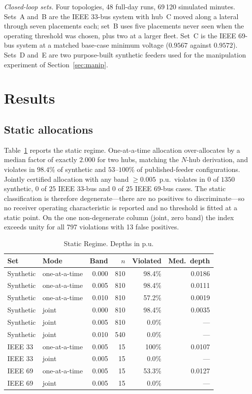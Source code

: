 \documentclass[lettersize,journal]{IEEEtran}
\begin{document}
\emph{Closed-loop sets.} Four topologies, 48 full-day runs, 69\,120 simulated
minutes. Sets~A and~B are the IEEE 33-bus system with hub~C moved along a
lateral through seven placements each; set~B uses five placements never seen
when the operating threshold was chosen, plus two at a larger fleet. Set~C is
the IEEE 69-bus system at a matched base-case minimum voltage ($0.9567$ against
$0.9572$). Sets~D and~E are two purpose-built synthetic feeders used for the
manipulation experiment of Section~\ref{sec:manip}.

\section{Results}\label{sec:results}

\subsection{Static allocations}
Table~\ref{tab:static} reports the static regime. One-at-a-time allocation
over-allocates by a median factor of exactly $2.000$ for two hubs, matching the
$N$-hub derivation, and violates in $98.4\%$ of synthetic and $53$--$100\%$ of
published-feeder configurations. Jointly certified allocation with any band
$\ge 0.005$~p.u.\ violates in $0$ of $1350$ synthetic, $0$ of $25$ IEEE 33-bus
and $0$ of $25$ IEEE 69-bus cases. The static classification is therefore
degenerate---there are no positives to discriminate---so no receiver operating
characteristic is reported and no threshold is fitted at a static point. On the
one non-degenerate column (joint, zero band) the index exceeds unity for all
797 violations with 13 false positives.

\begin{table}[!t]
\renewcommand{\arraystretch}{1.15}
\caption{Static Regime. Depths in p.u.}
\label{tab:static}
\centering\footnotesize
\begin{tabular}{@{}llrrrr@{}}
\toprule
Set & Mode & Band & $n$ & Violated & Med.\ depth\\
\midrule
Synthetic & one-at-a-time & 0.000 & 810 & 98.4\% & 0.0186\\
Synthetic & one-at-a-time & 0.005 & 810 & 98.4\% & 0.0111\\
Synthetic & one-at-a-time & 0.010 & 810 & 57.2\% & 0.0019\\
Synthetic & joint & 0.000 & 810 & 98.4\% & 0.0035\\
Synthetic & joint & 0.005 & 810 & 0.0\% & ---\\
Synthetic & joint & 0.010 & 540 & 0.0\% & ---\\
\midrule
IEEE 33 & one-at-a-time & 0.005 & 15 & 100\% & 0.0107\\
IEEE 33 & joint & 0.005 & 15 & 0.0\% & ---\\
IEEE 69 & one-at-a-time & 0.005 & 15 & 53.3\% & 0.0127\\
IEEE 69 & joint & 0.005 & 15 & 0.0\% & ---\\
\bottomrule
\end{tabular}
\end{table}
\end{document}
